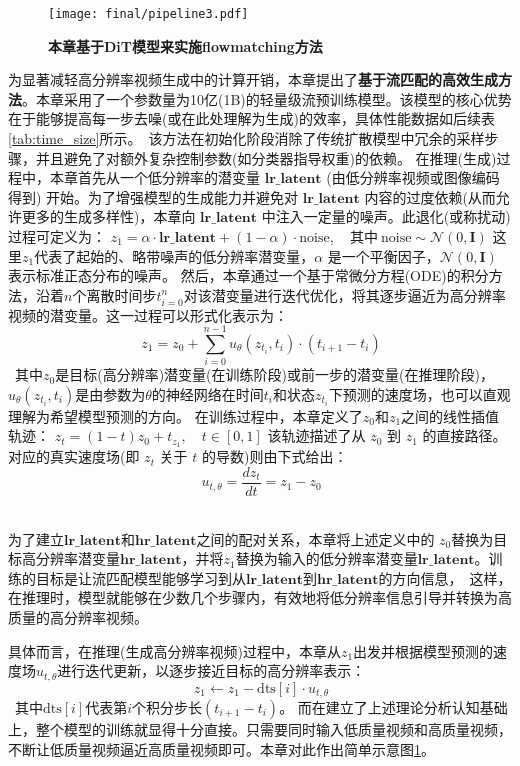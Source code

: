\begin{figure}[htbp]
    \centering
    \texttt{[image: final/pipeline3.pdf]}
    \caption{\textbf{本章基于DiT模型来实施flowmatching方法}
    }
    \label{fig:flowmatching}
\end{figure}
为显著减轻高分辨率视频生成中的计算开销，本章提出了\textbf{基于流匹配的高效生成方法}。本章采用了一个参数量为10亿(1B)的轻量级流预训练模型。该模型的核心优势在于能够提高每一步去噪(或在此处理解为生成)的效率，具体性能数据如后续表\ref{tab:time_size}所示。\
该方法在初始化阶段消除了传统扩散模型中冗余的采样步骤，并且避免了对额外复杂控制参数(如分类器指导权重)的依赖。
在推理(生成)过程中，本章首先从一个低分辨率的潜变量 $\mathbf{lr\_latent}$ (由低分辨率视频或图像编码得到) 开始。为了增强模型的生成能力并避免对 $\mathbf{lr\_latent}$ 内容的过度依赖(从而允许更多的生成多样性)，本章向 $\mathbf{lr\_latent}$ 中注入一定量的噪声。此退化(或称扰动)过程可定义为：
$z_1 = \alpha \cdot \mathbf{lr\_latent} + (1 - \alpha) \cdot \text{noise}, \quad \text{其中} \ \text{noise} \sim \mathcal{N}(0, \mathbf{I})$
这里$z_1$代表了起始的、略带噪声的低分辨率潜变量，$\alpha$ 是一个平衡因子，$\mathcal{N}(0, \mathbf{I})$ 表示标准正态分布的噪声。
然后，本章通过一个基于常微分方程(ODE)的积分方法，沿着$n$个离散时间步$t_{i=0}^n$对该潜变量进行迭代优化，将其逐步逼近为高分辨率视频的潜变量。这一过程可以形式化表示为：
\[\
z_1 = z_0 + \sum_{i=0}^{n-1} u_\theta(z_{t_i}, t_i) \cdot (t_{i+1} - t_i)
\]\
其中$z_0$是目标(高分辨率)潜变量(在训练阶段)或前一步的潜变量(在推理阶段)，$u_\theta(z_{t_i}, t_i)$是由参数为$\theta$的神经网络在时间$t_i$和状态$z_{t_i}$下预测的速度场，也可以直观理解为希望模型预测的方向。
在训练过程中，本章定义了$z_0$和$z_1$之间的线性插值轨迹：
$z_t = (1 - t) z_0 + t_{z_1}, \quad t \in [0,1]$
该轨迹描述了从 $z_0$ 到 $z_1$ 的直接路径。对应的真实速度场(即 $z_t$ 关于 $t$ 的导数)则由下式给出：\[\ 
u_{t,\theta} = \frac{dz_t}{dt} = z_1 - z_0
\]\



为了建立$\mathbf{lr\_latent}$和$\mathbf{hr\_latent}$之间的配对关系，本章将上述定义中的 $z_0$替换为目标高分辨率潜变量$\mathbf{hr\_latent}$，并将$z_1$替换为输入的低分辨率潜变量$\mathbf{lr\_latent}$。训练的目标是让流匹配模型能够学习到从$\mathbf{lr\_latent}$到$\mathbf{hr\_latent}$的方向信息，\
这样，在推理时，模型就能够在少数几个步骤内，有效地将低分辨率信息引导并转换为高质量的高分辨率视频。


具体而言，在推理(生成高分辨率视频)过程中，本章从$z_1$出发并根据模型预测的速度场$u_{t,\theta}$进行迭代更新，以逐步接近目标的高分辨率表示：
\[\ 
z_1 \leftarrow z_1 - \text{dts}[i] \cdot u_{t,\theta}
\]\, 其中$\text{dts}[i]$代表第$i$个积分步长$(t_{i+1} - t_{i})$。
而在建立了上述理论分析认知基础上，整个模型的训练就显得十分直接。只需要同时输入低质量视频和高质量视频，不断让低质量视频逼近高质量视频即可。本章对此作出简单示意图\ref{fig:flowmatching}。

